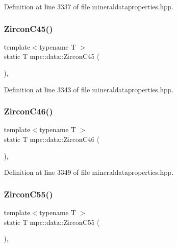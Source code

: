 Definition at line 3337 of file mineraldataproperties.\+hpp.

\mbox{\label{namespacempc_1_1data_afefea480867b1560a1febbea727088a9}} 
\subsubsection{\texorpdfstring{Zircon\+C45()}{ZirconC45()}}
{\footnotesize\ttfamily template$<$typename T $>$ \\
static T mpc\+::data\+::\+Zircon\+C45 (\begin{DoxyParamCaption}{ }\end{DoxyParamCaption})\hspace{0.3cm}{\ttfamily [inline]}, {\ttfamily [static]}}



Definition at line 3343 of file mineraldataproperties.\+hpp.

\mbox{\label{namespacempc_1_1data_abb777896f88ab698f65fda80ede60de9}} 
\subsubsection{\texorpdfstring{Zircon\+C46()}{ZirconC46()}}
{\footnotesize\ttfamily template$<$typename T $>$ \\
static T mpc\+::data\+::\+Zircon\+C46 (\begin{DoxyParamCaption}{ }\end{DoxyParamCaption})\hspace{0.3cm}{\ttfamily [inline]}, {\ttfamily [static]}}



Definition at line 3349 of file mineraldataproperties.\+hpp.

\mbox{\label{namespacempc_1_1data_ae6357a63242ae47b84d3ad8f9207f610}} 
\subsubsection{\texorpdfstring{Zircon\+C55()}{ZirconC55()}}
{\footnotesize\ttfamily template$<$typename T $>$ \\
static T mpc\+::data\+::\+Zircon\+C55 (\begin{DoxyParamCaption}{ }\end{DoxyParamCaption})\hspace{0.3cm}{\ttfamily [inline]}, {\ttfamily [static]}}



